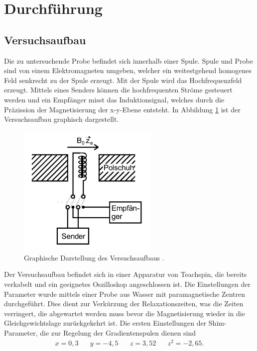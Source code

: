 \section{Durchführung}
\label{sec:Durchführung}
\subsection{Versuchsaufbau}
Die zu untersuchende Probe befindet sich innerhalb einer Spule. Spule und
Probe sind von einem Elektromagneten umgeben, welcher ein weitestgehend
homogenes Feld senkrecht zu der Spule erzeugt. Mit der Spule wird das
Hochfrequenzfeld erzeugt. Mittels eines Senders können die hochfrequenten Ströme
gesteuert werden und ein Empfänger misst das Induktionsignal, welches durch die
 Präzission der Magnetisierung der x-y-Ebene entsteht.
 In Abbildung \ref{fig:Aufbau} ist der Versuchsaufbau graphisch dargestellt.
 \begin{figure}[H]
 \centering
 \includegraphics[width=0.6\textwidth]{pics/Aufbau.png}
 \caption{Graphische Darstellung des Versuchsaufbaus \cite{Anleitung}.}
 \label{fig:Aufbau}
\end{figure}
Der Versuchsaufbau befindet sich in einer Apparatur von Teachspin, die
bereits verkabelt und ein geeignetes Oszilloskop angeschlossen ist. Die Einstellungen
der Parameter wurde mittels einer Probe aus Wasser mit paramagnetische Zentren
durchgeführt. Dies dient zur Verkürzung der Relaxationszeiten, was die Zeiten
verringert, die abgewartet werden muss bevor die Magnetisierung wieder in
die Gleichgewichtslage zurückgekehrt ist.
Die ersten Einstellungen der Shim-Parameter, die zur Regelung der Gradientenspulen
dienen sind
\begin{align*}
  x = 0,3 \hspace{20pt} y=-4,5  \hspace{20pt} z=3,52  \hspace{20pt} z^2=-2,65 .
\end{align*}
